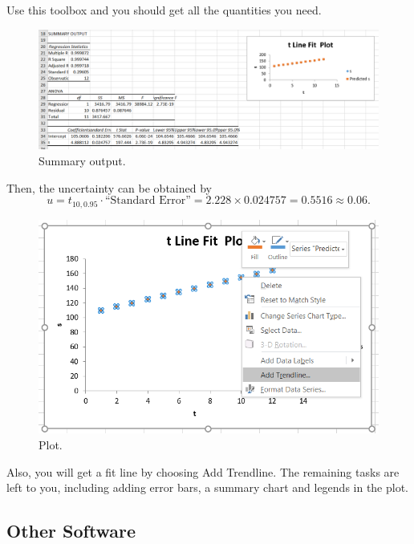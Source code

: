 \documentclass[12pt]{article}
\begin{document}
Use this toolbox and you should get all the quantities you need. 

\begin{figure}[H]
\centering
\includegraphics[width=16cm]{e9.png}
\caption{Summary output.}
\end{figure}

Then, the uncertainty can be obtained by
\begin{equation*}
u=t_{10,0.95}\cdot \text{``Standard Error''}=2.228\times0.024757=0.5516\approx0.06.
\end{equation*}

\begin{figure}[H]
\centering
\includegraphics[width=14cm]{e2.png}
\caption{Plot.}
\end{figure}

Also, you will get a fit line by choosing \textsf{Add Trendline}. The remaining tasks are left to you, including adding error bars, a summary chart and legends in the plot.

\vspace{4em}


\subsection{Other Software}
\end{document}
